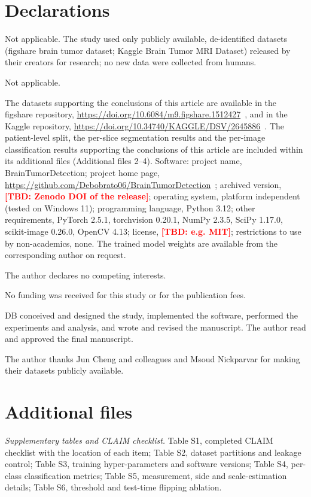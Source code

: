 \documentclass[pdflatex,sn-vancouver-num]{sn-jnl}
\newcommand{\tbd}[1]{\textcolor{red}{\textbf{[#1]}}}
\begin{document}
\section*{Declarations}
Not applicable. The study used only publicly available, de-identified datasets (figshare brain tumor dataset; Kaggle Brain Tumor MRI Dataset) released by their creators for research; no new data were collected from humans.

Not applicable.

The datasets supporting the conclusions of this article are available in the figshare repository, \url{https://doi.org/10.6084/m9.figshare.1512427}~\cite{cheng2017figshare}, and in the Kaggle repository, \url{https://doi.org/10.34740/KAGGLE/DSV/2645886}~\cite{nickparvar2021kaggle}. The patient-level split, the per-slice segmentation results and the per-image classification results supporting the conclusions of this article are included within its additional files (Additional files 2--4). Software: project name, BrainTumorDetection; project home page, \url{https://github.com/Debobrato06/BrainTumorDetection}~\cite{biswas2026repo}; archived version, \tbd{TBD: Zenodo DOI of the release}; operating system, platform independent (tested on Windows 11); programming language, Python 3.12; other requirements, PyTorch 2.5.1, torchvision 0.20.1, NumPy 2.3.5, SciPy 1.17.0, scikit-image 0.26.0, OpenCV 4.13; license, \tbd{TBD: e.g. MIT}; restrictions to use by non-academics, none. The trained model weights are available from the corresponding author on request.

The author declares no competing interests.

No funding was received for this study or for the publication fees.

DB conceived and designed the study, implemented the software, performed the experiments and analysis, and wrote and revised the manuscript. The author read and approved the final manuscript.

The author thanks Jun Cheng and colleagues and Msoud Nickparvar for making their datasets publicly available.



\section*{Additional files}
\emph{Supplementary tables and CLAIM checklist.} Table S1, completed CLAIM checklist with the location of each item; Table S2, dataset partitions and leakage control; Table S3, training hyper-parameters and software versions; Table S4, per-class classification metrics; Table S5, measurement, side and scale-estimation details; Table S6, threshold and test-time flipping ablation.
\end{document}
